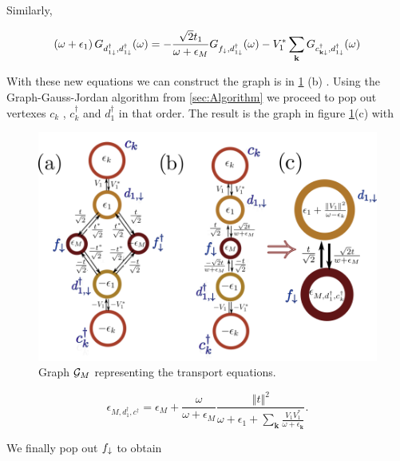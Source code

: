 \noindent Similarly, 

\begin{equation}
    \left(\omega+\epsilon_{1}\right)G_{d_{1\downarrow}^{\dagger},d_{1\downarrow}^{\dagger}}(\omega)=-\frac{\sqrt{2}t_{1}}{\omega+\epsilon_{M}}G_{f_{\downarrow},d_{1\downarrow}^{\dagger}}(\omega)-V_{1}^{*}\sum_{\mathbf{k}}G_{c_{\mathbf{k\downarrow}}^{\dagger},d_{1\downarrow}^{\dagger}}(\omega)
\end{equation} 
 
 
 With these new equations we can construct the graph is  in \ref{fig:green-M-QD} (b) .  Using the Graph-Gauss-Jordan algorithm from \ref{sec:Algorithm}  we proceed to pop out vertexes $c_k$ , $c_k^\dagger$ and $d_1^\dagger$ in that order. The result is the graph in figure \ref{fig:green-M-QD}(c) with 
 
 \begin{figure}[t]
    \centering
    \includegraphics[scale=0.5]{IMAGES/Graphs/Grenn-Majorana.png}
    \caption{ \label{fig:green-M-QD} Graph $\mathcal{G}_M$ representing the transport equations.   \protect\Source{}}
\end{figure}
 
 \begin{equation}
    \epsilon_{M,d_1^\dagger,c^\dagger}= \epsilon_{M}+\frac{\omega}{\omega+\epsilon_{M}}\frac{\left\Vert t\right\Vert ^{2}}{\omega+\epsilon_{1}+\sum_{\mathbf{k}}\frac{V_{1}V_{1}^{*}}{\omega+\epsilon_{\mathbf{k}}}}.
\end{equation}
 
 \noindent We finally pop out $f_\downarrow$ to obtain 
 
